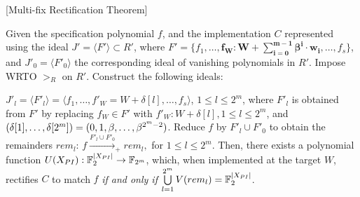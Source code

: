 \begin{Theorem}{[Multi-fix Rectification Theorem]}\label{Thm:rect}

Given the specification polynomial $f$, and the implementation
$C$ represented using the ideal $J' = \langle F'\rangle\subset R'$,
where $F'=\{f_1,\dots,\bm{f_W:W+\sum_{i=0}^{m-1}\beta^i \cdot w_i},
\dots,f_s\}$, and $J'_0=\langle F'_0\rangle$ the corresponding ideal
of vanishing polynomials in $R'$. Impose WRTO $>_R$ on $R'$.
Construct the following ideals:  
\bi
\item {\small $J'_l = \langle F'_l\rangle =\langle f_1,\dots,f'_W=W+\delta[l],\dots,f_s\rangle$},
  $1 \leq l \leq 2^m$, where $F'_l$ is obtained from $F'$ by
  replacing $f_W \in F'$ with $f'_W: W + \delta[l], 1\leq l \leq 2^m$,
  and $(\delta[1],\dots,\delta[2^{m}]) =
  (0,1,\beta,\dots,\beta^{2^m-2})$. 
\ei
Reduce $f$ by $F'_l\cup F'_0$ to obtain the remainders $rem_l$: 
$f\xrightarrow{F'_l\cup F'_{0}}_+ rem_l,$  for $1 \leq l \leq 2^m$. 
Then, there exists a polynomial function 
$U(X_{PI}): {\mathbb{F}}_{2}^{|X_{PI}|}\rightarrow {\mathbb{F}}_{2^m}$, which, when
 implemented at the target $W$, rectifies $C$ to match $f$ \textit{if
   and only if} $\bigcup\limits_{l=1}^{2^m}V(rem_l) = {\mathbb{F}}_{2}^{|X_{PI}|}$.
\end{Theorem}

